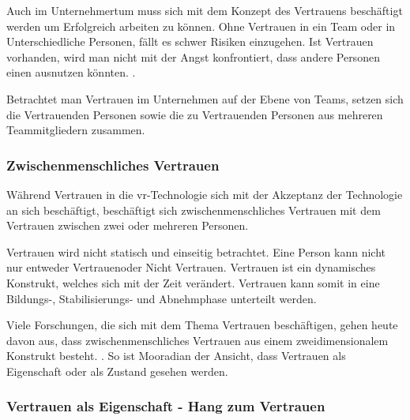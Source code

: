 \documentclass[a4paper,11pt]{article}%
\renewcommand{\\}{\vspace*{0.5\baselineskip} \newline}
\begin{document}
Auch im Unternehmertum muss sich mit dem Konzept des Vertrauens beschäftigt werden um Erfolgreich arbeiten zu können. Ohne Vertrauen in ein Team oder in Unterschiedliche Personen, fällt es schwer Risiken einzugehen. Ist Vertrauen vorhanden, wird man nicht mit der Angst konfrontiert, dass andere Personen einen ausnutzen könnten. \citep[p.1152]{breuer2016does}.

Betrachtet man Vertrauen im Unternehmen auf der Ebene von Teams, setzen sich die Vertrauenden Personen sowie die zu Vertrauenden Personen aus mehreren Teammitgliedern zusammen.
 

		\subsubsection{Zwischenmenschliches Vertrauen}
Während Vertrauen in die \ac{vr}-Technologie sich mit der Akzeptanz der Technologie an sich beschäftigt, beschäftigt sich zwischenmenschliches Vertrauen mit dem Vertrauen zwischen zwei oder mehreren Personen. \citep{mcknight2011trust}

Vertrauen wird nicht statisch und einseitig betrachtet. Eine Person kann nicht nur entweder \dq Vertrauen\dq oder \dq Nicht Vertrauen\dq. Vertrauen ist ein dynamisches Konstrukt, welches sich mit der Zeit verändert. Vertrauen kann somit in eine Bildungs-, Stabilisierungs- und Abnehmphase unterteilt werden. \citep[p.396]{rousseau1998not}

Viele Forschungen, die sich mit dem Thema Vertrauen beschäftigen, gehen heute davon aus, dass zwischenmenschliches Vertrauen aus einem zweidimensionalem Konstrukt besteht. \citep{johnson2005cognitive} \citep{cook1980new}. So ist Mooradian \citep[p.524-525]{mooradian2006trusts} der Ansicht, dass Vertrauen als \dq Eigenschaft\dq{} oder als \dq Zustand\dq{} gesehen werden.

	\subsubsection{Vertrauen als Eigenschaft - Hang zum Vertrauen}
\end{document}
